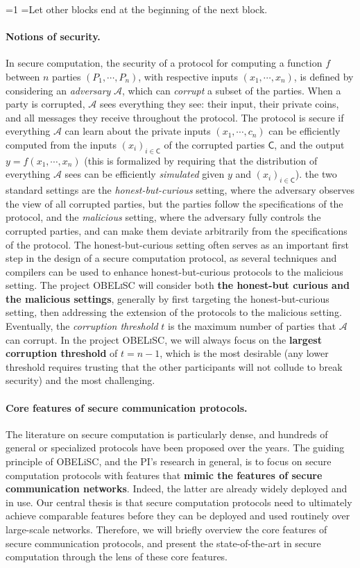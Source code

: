 \documentclass[oneside, a4paper, onecolumn, 11pt]{article}
\newcommand{\OBELiSC}{\textsc{OBELiSC}\xspace}
\newcommand{\Adv}{\mathcal{A}}
\newcounter{alphasect}
\def\alphainsection{0}
\newenvironment{alphasection}{%
  \ifnum\alphainsection=1%
    \errhelp={Let other blocks end at the beginning of the next block.}
    \errmessage{Nested Alpha section not allowed}
  \fi%
  \setcounter{alphasect}{0}
  \def\alphainsection{1}
}{%
  \setcounter{alphasect}{0}
  \def\alphainsection{0}
}%
\begin{document}
\begin{alphasection}
\paragraph{Notions of security.} In secure computation, the security of a protocol for computing a function $f$ between $n$ parties $(P_1, \cdots, P_n)$, with respective inputs $(x_1, \cdots, x_n)$, is defined by considering an \emph{adversary} $\Adv$, which can \emph{corrupt} a subset of the parties. When a party is corrupted, $\Adv$ sees everything they see: their input, their private coins, and all messages they receive throughout the protocol. The protocol is secure if everything $\Adv$ can learn about the private inputs $(x_1, \cdots, c_n)$ can be efficiently computed from the inputs $(x_i)_{i \in \mathsf{C}}$ of the corrupted parties $\mathsf{C}$, and the output $y = f(x_1, \cdots, x_n)$ (this is formalized by requiring that the distribution of everything $\Adv$ sees can be efficiently \emph{simulated} given $y$ and $(x_i)_{i \in \mathsf{C}}$). the two standard settings are the \emph{honest-but-curious} setting, where the adversary observes the view of all corrupted parties, but the parties follow the specifications of the protocol, and the \emph{malicious} setting, where the adversary fully controls the corrupted parties, and can make them deviate arbitrarily from the specifications of the protocol. The honest-but-curious setting often serves as an important first step in the design of a secure computation protocol, as several techniques and compilers can be used to enhance honest-but-curious protocols to the malicious setting. The project \OBELiSC will consider both \textbf{the honest-but curious and the malicious settings}, generally by first targeting the honest-but-curious setting, then addressing the extension of the protocols to the malicious setting. Eventually, the \emph{corruption threshold} $t$ is the maximum number of parties that $\Adv$ can corrupt. In the project \OBELiSC, we will always focus on the \textbf{largest corruption threshold} of $t = n-1$, which is the most desirable (any lower threshold requires trusting that the other participants will not collude to break security) and the most challenging.

\paragraph{Core features of secure communication protocols.} The literature on secure computation is particularly dense, and hundreds of general or specialized protocols have been proposed over the years. The guiding principle of OBELiSC, and the PI's research in general, is to focus on secure computation protocols with features that \textbf{mimic the features of secure communication networks}. Indeed, the latter are already widely deployed and in use. Our central thesis is that secure computation protocols need to ultimately achieve comparable features before they can be deployed and used routinely over large-scale networks. Therefore, we will briefly overview the core features of secure communication protocols, and present the state-of-the-art in secure computation through the lens of these core features.


\end{alphasection}
\end{document}
